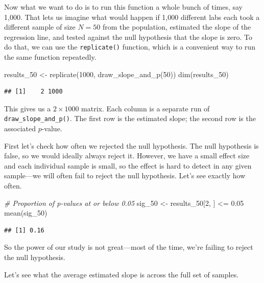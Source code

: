\documentclass[
  12pt,
  oneside,openany]{book}
\newenvironment{Shaded}{\begin{snugshade}}{\end{snugshade}}
\newcommand{\CommentTok}[1]{\textcolor[rgb]{0.56,0.35,0.01}{\textit{#1}}}
\newcommand{\DecValTok}[1]{\textcolor[rgb]{0.00,0.00,0.81}{#1}}
\newcommand{\FloatTok}[1]{\textcolor[rgb]{0.00,0.00,0.81}{#1}}
\newcommand{\FunctionTok}[1]{\textcolor[rgb]{0.00,0.00,0.00}{#1}}
\newcommand{\NormalTok}[1]{#1}
\newcommand{\OtherTok}[1]{\textcolor[rgb]{0.56,0.35,0.01}{#1}}
\newcommand{\SpecialCharTok}[1]{\textcolor[rgb]{0.00,0.00,0.00}{#1}}
\begin{document}
Now what we want to do is to run this function a whole bunch of times, say 1,000. That lets us imagine what would happen if 1,000 different labs each took a different sample of size \(N = 50\) from the population, estimated the slope of the regression line, and tested against the null hypothesis that the slope is zero. To do that, we can use the \texttt{replicate()} function, which is a convenient way to run the same function repeatedly.

\begin{Shaded}
\begin{Highlighting}[]
\NormalTok{results\_50 }\OtherTok{\textless{}{-}} \FunctionTok{replicate}\NormalTok{(}\DecValTok{1000}\NormalTok{, }\FunctionTok{draw\_slope\_and\_p}\NormalTok{(}\DecValTok{50}\NormalTok{))}
\FunctionTok{dim}\NormalTok{(results\_50)}
\end{Highlighting}
\end{Shaded}

\begin{verbatim}
## [1]    2 1000
\end{verbatim}

This gives us a \(2 \times 1000\) matrix. Each column is a separate run of \texttt{draw\_slope\_and\_p()}. The first row is the estimated slope; the second row is the associated \(p\)-value.

First let's check how often we rejected the null hypothesis. The null hypothesis is false, so we would ideally always reject it. However, we have a small effect size and each individual sample is small, so the effect is hard to detect in any given sample---we will often fail to reject the null hypothesis. Let's see exactly how often.

\begin{Shaded}
\begin{Highlighting}[]
\CommentTok{\# Proportion of p{-}values at or below 0.05}
\NormalTok{sig\_50 }\OtherTok{\textless{}{-}}\NormalTok{ results\_50[}\DecValTok{2}\NormalTok{, ] }\SpecialCharTok{\textless{}=} \FloatTok{0.05}
\FunctionTok{mean}\NormalTok{(sig\_50)}
\end{Highlighting}
\end{Shaded}

\begin{verbatim}
## [1] 0.16
\end{verbatim}

So the power of our study is not great---most of the time, we're failing to reject the null hypothesis.

Let's see what the average estimated slope is across the full set of samples.
\end{document}

